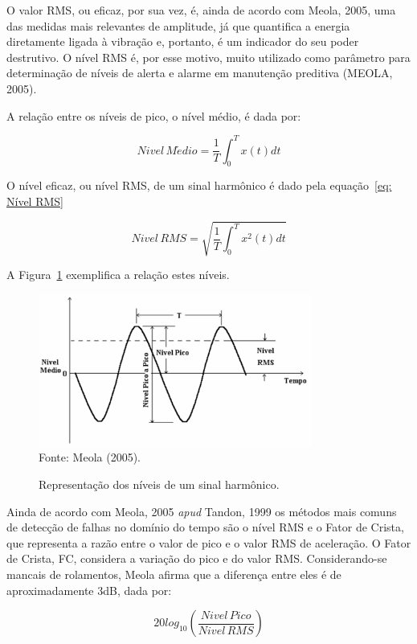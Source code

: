 \documentclass[
	12pt,				
	oneside,			
	a4paper,			
	english,			
	brazil,			
	]{abntex2ppgsi}
\begin{document}
O valor RMS, ou eficaz, por sua vez, é, ainda de acordo com Meola, 2005, uma das medidas mais relevantes de amplitude, já que quantifica a energia diretamente ligada à vibração e, portanto, é um indicador do seu poder destrutivo. O nível RMS é, por esse motivo, muito utilizado como parâmetro para determinação de níveis de alerta e alarme em manutenção preditiva (MEOLA, 2005).

A relação entre os níveis de pico, o nível médio, é dada por:

\begin{equation}
	Nivel \, M\acute{e}dio = \frac{1}{T} \int_{0}^{T} x(t)dt
	\label{eq: Nível Médio}
\end{equation}

O nível eficaz, ou nível RMS, de um sinal harmônico é dado pela equação~\ref{eq: Nível RMS}

\begin{equation}
	Nivel \, RMS = \sqrt{ \frac{1}{T} \int_{0}^{T} x^{2}(t)dt }
	\label{eq: Nível RMS}
\end{equation}

A Figura~\ref{RelacaoSinalHarmonico} exemplifica a relação estes níveis.

\begin{figure}[!htb]
\centering
\caption {Representação dos níveis de um sinal harmônico.}
\includegraphics[width=\textwidth,height=50mm,keepaspectratio]{Figura17} \\
Fonte: Meola (2005).
\label{RelacaoSinalHarmonico}
\end{figure}

Ainda de acordo com Meola, 2005 \textit{apud} Tandon, 1999 os métodos mais comuns de detecção de falhas no domínio do tempo são o nível RMS e o Fator de Crista, que representa a razão entre o valor de pico e o valor RMS de aceleração. O Fator de Crista, FC, considera a variação do pico e do valor RMS. Considerando-se mancais de rolamentos, Meola afirma que a diferença entre eles é de aproximadamente 3dB, dada por:

\begin{equation}
	20log_{10} \left ( \frac{Nivel \,Pico}{Nivel \, RMS} \right )
	\label{eq: Nível de Pico vs RMS}
\end{equation}
\end{document}
